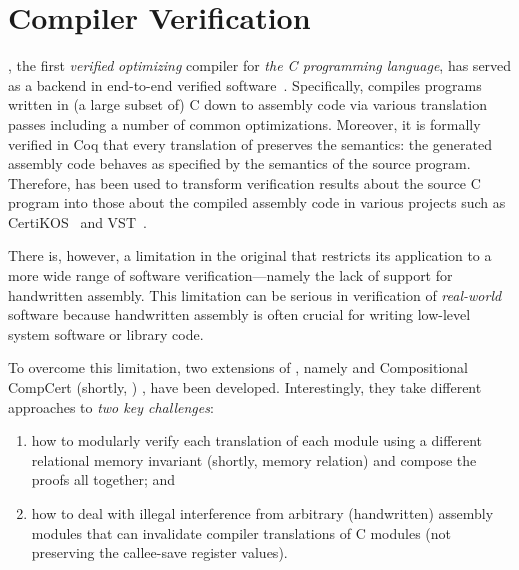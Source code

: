 \section{Compiler Verification}\label{sec:overview:compiler}
\cc{} \cite{CompCert, Compcert-CACM}, the first \emph{verified}
\emph{optimizing} compiler for \emph{the C programming language}, has
served as a backend in end-to-end verified
software~\cite{appel2014program}. Specifically, \cc{} compiles programs written in (a
large subset of) C down to assembly code via various translation
passes including a number of common optimizations.  Moreover, it is
formally verified in Coq that every translation of \cc{} preserves the
semantics: the generated assembly code behaves as specified by the
semantics of the source program. Therefore, \cc{} has been used to
transform verification results about the source C program into those
about the compiled assembly code in various projects such as
CertiKOS~\cite{CertiKOS11, CertiKOS16} and VST~\cite{VST}.

There is, however, a limitation in the original \cc{} that restricts
its application to a more wide range of software verification---namely
the lack of support for handwritten assembly. This
limitation can be serious in verification of \emph{real-world}
software because handwritten assembly is often crucial for writing
low-level system software or library code.

To overcome this limitation, two extensions of \cc{}, namely \ccx{}
\cite{gu:dscal,wang:saccx} and Compositional CompCert (shortly, \ccc{}) \cite{beringer:isem,stewart:ccc}, have
been developed. Interestingly, they take different approaches to
\emph{two key challenges}:
\begin{enumerate}
\item how to modularly verify each translation of each
module using a different relational memory invariant (shortly, memory relation) and compose the proofs all
together; and
\item how to deal with illegal interference from
arbitrary (handwritten) assembly modules that can invalidate compiler
translations of C modules (\eg not preserving the
callee-save register values).
\end{enumerate}

